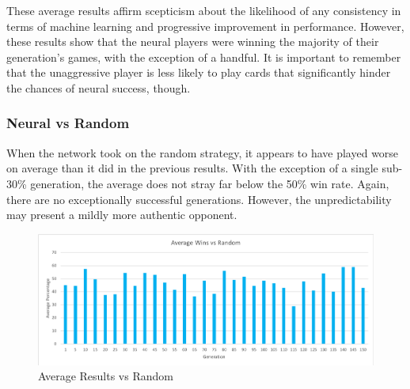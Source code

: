 \documentclass[12pt,a4paper]{article}
\begin{document}
\newpage
These average results affirm scepticism about the likelihood of any consistency in terms of machine learning and progressive improvement in performance. However, these results show that the neural players were winning the majority of their generation's games, with the exception of a handful. It is important to remember that the unaggressive player is less likely to play cards that significantly hinder the chances of neural success, though.

\subsubsection{Neural vs Random}
When the network took on the random strategy, it appears to have played worse on average than it did in the previous results. With the exception of a single sub-30\% generation, the average does not stray far below the 50\% win rate. Again, there are no exceptionally successful generations. However, the unpredictability may present a mildly more authentic opponent.

\begin{figure}[h]
	\centering
	\includegraphics[width = \textwidth]{Rand1.png}
	\caption{Average Results vs Random}
\end{figure}
\end{document}
